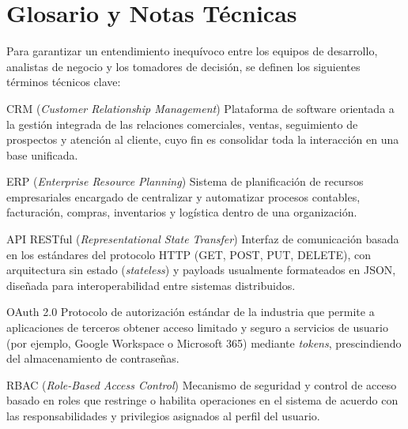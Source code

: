 \section{Glosario y Notas Técnicas}

Para garantizar un entendimiento inequívoco entre los equipos de desarrollo, analistas de negocio y los tomadores de decisión, se definen los siguientes términos técnicos clave:

\begin{GlossaryBox}{CRM (\textit{Customer Relationship Management})}
    Plataforma de software orientada a la gestión integrada de las relaciones comerciales, ventas, seguimiento de prospectos y atención al cliente, cuyo fin es consolidar toda la interacción en una base unificada.
\end{GlossaryBox}

\begin{GlossaryBox}{ERP (\textit{Enterprise Resource Planning})}
    Sistema de planificación de recursos empresariales encargado de centralizar y automatizar procesos contables, facturación, compras, inventarios y logística dentro de una organización.
\end{GlossaryBox}

\begin{GlossaryBox}{API RESTful (\textit{Representational State Transfer})}
    Interfaz de comunicación basada en los estándares del protocolo HTTP (GET, POST, PUT, DELETE), con arquitectura sin estado (\textit{stateless}) y payloads usualmente formateados en JSON, diseñada para interoperabilidad entre sistemas distribuidos.
\end{GlossaryBox}

\begin{GlossaryBox}{OAuth 2.0}
    Protocolo de autorización estándar de la industria que permite a aplicaciones de terceros obtener acceso limitado y seguro a servicios de usuario (por ejemplo, Google Workspace o Microsoft 365) mediante \textit{tokens}, prescindiendo del almacenamiento de contraseñas.
\end{GlossaryBox}

\begin{GlossaryBox}{RBAC (\textit{Role-Based Access Control})}
    Mecanismo de seguridad y control de acceso basado en roles que restringe o habilita operaciones en el sistema de acuerdo con las responsabilidades y privilegios asignados al perfil del usuario.
\end{GlossaryBox}

